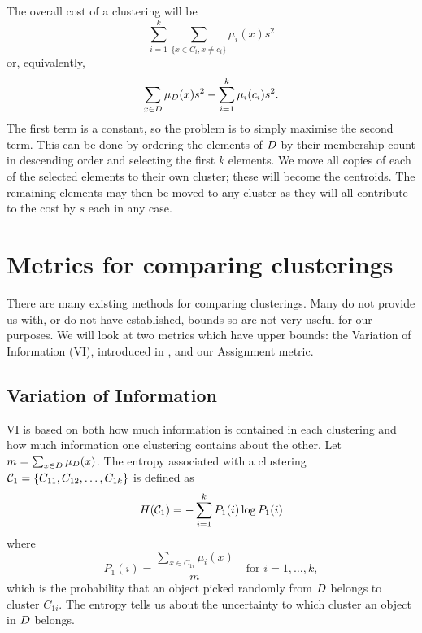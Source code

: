 The overall cost of a clustering will be
\begin{equation*}
  \sum_{i=1}^{k} \sum_{\{x \in C_i,x \neq c_i\}} \mu_{i}(x)s^2
\end{equation*}
or, equivalently,
\begin{equation*}
  \sum_{x \in D} \mu_{D}(x)s^2 - \sum_{i=1}^{k} \mu_{i}(c_i)s^2.
\end{equation*}
The first term is a constant, so the problem is to simply maximise the second
term.  This can be done by ordering the elements of $D$ by their
membership count in descending order and selecting the first $k$ elements.  We
move all copies of each of the selected elements to their own cluster; these
will become the centroids.  The remaining elements may then be moved to any
cluster as they will all contribute to the cost by $s$ each in any case.

\section{Metrics for comparing clusterings}
\label{sec:metr-comp-clust}

There are many existing methods for comparing clusterings.  Many do not
provide us with, or do not have established, bounds so are not very useful for
our purposes.  We will look at two metrics which have upper bounds: the
Variation of Information (VI), introduced in \citep{meila-2007}, and our
Assignment metric.

\subsection{Variation of Information}
\label{sec:existing-methods}

VI is based on both how much information is contained in each clustering and
how much information one clustering contains about the other.  Let $m =
\sum_{x \in D} \mu_{D}(x)$.  The entropy associated with a clustering
$\mathcal{C}_1 = \{C_{11},C_{12},\dotsc,C_{1k}\}$ is defined as
\begin{equation*}
  H(\mathcal{C}_1) = - \sum_{i=1}^{k} P_1(i) \log P_1(i)
\end{equation*}
where
\begin{equation*}
  P_1(i) = \frac{\displaystyle \sum_{x \in C_{1i}} \mu_i(x)}{m}
  \quad \text{for $i = 1, \dotsc, k$},
\end{equation*}
which is the probability that an object picked randomly from $D$ belongs
to cluster $C_{1i}$.  The entropy tells us about the uncertainty to which
cluster an object in $D$ belongs.

